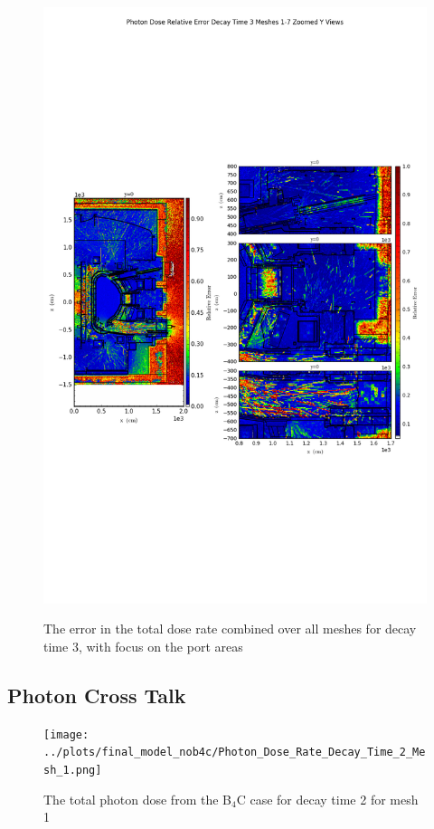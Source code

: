 \documentclass[12pt]{article}
\begin{document}
\begin{figure}[ht!]
\centering
\includegraphics[trim={0cm 9cm 0cm 10cm},clip,scale=0.75]{../plots/final_model/Photon_Dose_Relative_Error_Decay_Time_3_Meshes_1-7_Zoomed_Y_Views.png}
\label{fig:photons_dc3_b4c_total_error_zoomed}
\caption{The error in the total dose rate combined over all meshes for decay time 3, with focus on the port areas}
\end{figure}
\clearpage
\subsection{Photon Cross Talk}
\begin{figure}[ht!]
\centering
\texttt{[image: ../plots/final\_model\_nob4c/Photon\_Dose\_Rate\_Decay\_Time\_2\_Mesh\_1.png]}
\label{fig:photons_dc2_no4bc_m1_flux}
\caption{The total photon dose from the B$_4$C case for decay time 2 for mesh 1}
\end{figure}
\end{document}
